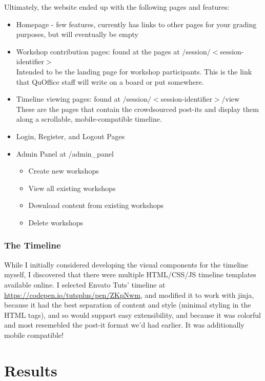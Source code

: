 \documentclass[12pt] {article}
\begin{document}
Ultimately, the website ended up with the following pages and features:
\begin{itemize}
    \item Homepage - few features, currently has links to other pages for your grading purposes, but will eventually be empty
    \item Workshop contribution pages: found at the pages at $/$session$/<$session-identifier$>$\\
    Intended to be the landing page for workshop participants. This is the link that QuOffice staff will write on a board or put somewhere.
    \item Timeline viewing pages: found at $/$session$/<$session-identifier$>/$view\\
    These are the pages that contain the crowdsourced post-its and display them along a scrollable, mobile-compatible timeline.
    \item Login, Register, and Logout Pages 
    \item Admin Panel at /admin\_panel
    \begin{itemize}
        \item Create new workshops
        \item View all existing workshops
        \item Download content from existing workshops
        \item Delete workshops
    \end{itemize}
\end{itemize}

\subsubsection{The Timeline}
While I initially considered developing the visual components for the timeline myself, I discovered that there were multiple HTML/CSS/JS timeline templates available online. I selected Envato Tuts' timeline at \href{url}{https://codepen.io/tutsplus/pen/ZKpNwm}, and modified it to work with jinja, because it had the best separation of content and style (minimal styling in the HTML tags), and so would support easy extensibility, and because it was colorful and most resemebled the post-it format we'd had earlier. It was additionally mobile compatible!

\section{Results}
\end{document}
